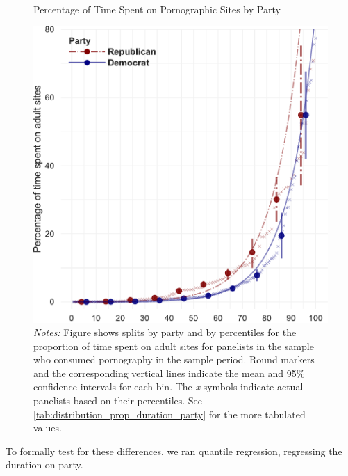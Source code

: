 \documentclass[12pt, letterpaper]{article}
\begin{document}
\begin{figure}[ht]
	\centering
	\caption{Percentage of Time Spent on Pornographic Sites by Party}
	\includegraphics[width=.6\linewidth]{../figs/distribution_proportion_duration_on_adultsites_by_party.pdf}
	\caption*{\footnotesize \emph{Notes:} 
		Figure shows splits by party and by percentiles for the proportion of time spent on adult sites for panelists in the sample who consumed pornography in the sample period.
		Round markers and the corresponding vertical lines indicate the mean and 95\% confidence intervals for each bin.
		The \emph{x} symbols indicate actual panelists based on their percentiles.
		See \cref{tab:distribution_prop_duration_party} for the more tabulated values.
	}
	\label{fig:distribution_prop_duration_party}
\end{figure}


\newpage


To formally test for these differences, we ran quantile regression, regressing the duration on party. 
\end{document}
